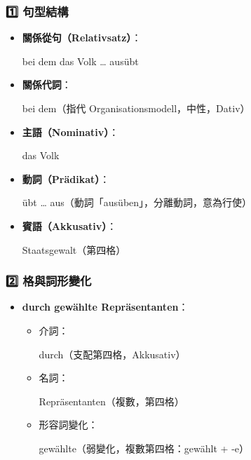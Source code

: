 \documentclass{article}
\begin{document}
\subsubsection{1️⃣ 句型結構}
\begin{itemize}
    \item \textbf{關係從句（Relativsatz）}：
    \begin{tcolorbox}[colframe=blue!50, colback=blue!5, sharp corners]
        bei dem das Volk … ausübt
    \end{tcolorbox}
    \item \textbf{關係代詞}：
    \begin{tcolorbox}[colframe=red!50, colback=red!5, sharp corners]
        bei dem（指代 Organisationsmodell，中性，Dativ）
    \end{tcolorbox}
    \item \textbf{主語（Nominativ）}：
    \begin{tcolorbox}[colframe=green!50, colback=green!5, sharp corners]
        das Volk
    \end{tcolorbox}
    \item \textbf{動詞（Prädikat）}：
    \begin{tcolorbox}[colframe=orange!50, colback=orange!5, sharp corners]
        übt … aus（動詞「ausüben」，分離動詞，意為行使）
    \end{tcolorbox}
    \item \textbf{賓語（Akkusativ）}：
    \begin{tcolorbox}[colframe=purple!50, colback=purple!5, sharp corners]
        Staatsgewalt（第四格）
    \end{tcolorbox}
\end{itemize}

\subsubsection{2️⃣ 格與詞形變化}
\begin{itemize}
    \item \textbf{durch gewählte Repräsentanten}：
    \begin{itemize}
        \item 介詞：
        \begin{tcolorbox}[colframe=red!50, colback=red!5, sharp corners]
            durch（支配第四格，Akkusativ）
        \end{tcolorbox}
        \item 名詞：
        \begin{tcolorbox}[colframe=blue!50, colback=blue!5, sharp corners]
            Repräsentanten（複數，第四格）
        \end{tcolorbox}
        \item 形容詞變化：
        \begin{tcolorbox}[colframe=green!50, colback=green!5, sharp corners]
            gewählte（弱變化，複數第四格：gewählt + -e）
        \end{tcolorbox}
    \end{itemize}
\end{itemize}
\end{document}
